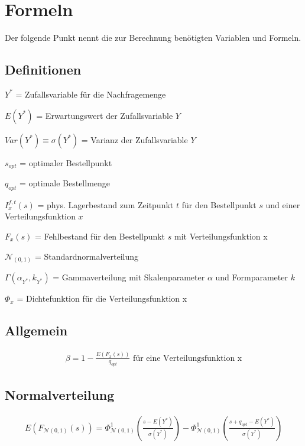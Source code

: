 \section{Formeln}
Der folgende Punkt nennt die zur Berechnung benötigten Variablen und Formeln.
\subsection{Definitionen}
\(Y^*\) = Zufallsvariable für die Nachfragemenge

\(E(Y^*)\) = Erwartungswert der Zufallsvariable $Y$

\(Var(Y^*) \equiv \sigma(Y^*)\) = Varianz der Zufallsvariable $Y$

\(s_{opt}\) = optimaler Bestellpunkt

\(q_{opt}\) = optimale Bestellmenge

\(I^{f, t}_{x}(s)\) = phys. Lagerbestand zum Zeitpunkt \(t\) für den Bestellpunkt \(s\) und einer Verteilungsfunktion \(x\) 

\(F_x(s)\) = Fehlbestand für den Bestellpunkt \(s\) mit Verteilungsfunktion x 

\(\mathcal{N}_{(0,1)}\) = Standardnormalverteilung

\(\Gamma(\alpha_{Y^*}, k_{Y^*})\) = Gammaverteilung mit Skalenparameter \(\alpha\) und Formparameter \(k\)

\(\Phi_x\) = Dichtefunktion für die Verteilungsfunktion x

\subsection{Allgemein}
\begin{gather*}
\beta = 1-\frac{E\left(F_{x}(s)\right)}{q_{opt}} \text{ für eine Verteilungsfunktion x}
\end{gather*}
\subsection{Normalverteilung}
\begin{gather*}
E\left(F_{\mathcal{N}(0,1)}(s)\right)=\Phi^1_{\mathcal{N}(0,1)}\left(\frac{s-E(Y^*)}{\sigma(Y^*)}\right)-\Phi^1_{\mathcal{N}(0,1)}\left(\frac{s+q_{opt}-E(Y^*)}{\sigma(Y^*)}\right) \\
\end{gather*}
